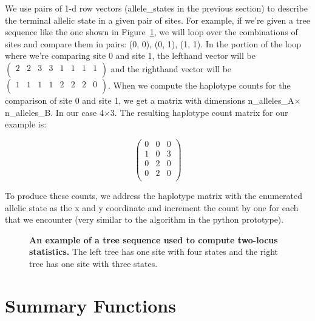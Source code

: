 \documentclass[12pt]{article}
\begin{document}
We use pairs of 1-d row vectors (allele\_states in the previous section) to
describe the terminal allelic state in a given pair of sites. For example, if
we're given a tree sequence like the one shown in Figure~\ref{fig:example_tree},
we will loop over the combinations of sites and compare them in pairs: (0, 0),
(0, 1), (1, 1). In the portion of the loop where we're comparing site 0 and site
1, the lefthand vector will be $\left(\begin{array}{cccccccc}2 & 2 & 3 & 3 & 1 &
1 & 1 & 1 \\\end{array}\right)$ and the righthand vector will be
$\left(\begin{array}{cccccccc} 1 & 1 & 1 & 1 & 2 & 2 & 2 & 0
\\\end{array}\right)$. When we compute the haplotype counts for the comparison
of site 0 and site 1, we get a matrix with dimensions
n\_alleles\_A$\times$n\_alleles\_B. In our case 4$\times$3. The resulting
haplotype count matrix for our example is:

\[
  \left(
    \begin{array}{ccc}
      0 & 0 & 0 \\
      1 & 0 & 3 \\
      0 & 2 & 0 \\
      0 & 2 & 0 \\
    \end{array}
  \right)
\]

To produce these counts, we address the haplotype matrix with the enumerated
allelic state as the x and y coordinate and increment the count by one for each
that we encounter (very similar to the algorithm in the python prototype).
\
\begin{figure}[H]
    \centering
    
    \caption{
      \textbf{An example of a tree sequence used to compute two-locus statistics.}
      The left tree has one site with four states and the right tree has one
      site with three states.
    }
\label{fig:example_tree}
\end{figure}



\section{Summary Functions}
\end{document}

